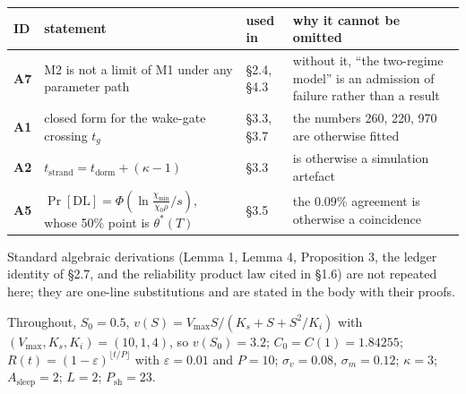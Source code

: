 \documentclass[11pt,a4paper]{article}
\newcounter{none}
\begin{document}
{\def\LTcaptype{none} %
\begin{longtable}[]{@{}
  >{\raggedright\arraybackslash}p{}
  >{\raggedright\arraybackslash}p{}
  >{\raggedright\arraybackslash}p{}
  >{\raggedright\arraybackslash}p{}@{}}
\toprule\noalign{}
\begin{minipage}[b]{\linewidth}\raggedright
ID
\end{minipage} & \begin{minipage}[b]{\linewidth}\raggedright
statement
\end{minipage} & \begin{minipage}[b]{\linewidth}\raggedright
used in
\end{minipage} & \begin{minipage}[b]{\linewidth}\raggedright
why it cannot be omitted
\end{minipage} \\
\midrule\noalign{}
\endhead
\bottomrule\noalign{}
\endlastfoot
\textbf{A7} & M2 is not a limit of M1 under any parameter path & §2.4, §4.3 & without it, ``the two-regime model'' is an admission of failure rather than a result \\
\textbf{A1} & closed form for the wake-gate crossing \(t_g\) & §3.3, §3.7 & the numbers 260, 220, 970 are otherwise fitted \\
\textbf{A2} & \(t_{\mathrm{strand}}=t_{\mathrm{dorm}}+(\kappa-1)\) & §3.3 & 279 is otherwise a simulation artefact \\
\textbf{A5} & \(\Pr[\mathrm{DL}]=\Phi\!\left(\ln\frac{\chi_{\min}}{\chi_0\rho}\big/s\right)\), whose 50\% point is \(\theta^\ast(T)\) & §3.5 & the 0.09\% agreement is otherwise a coincidence \\
\end{longtable}
}

Standard algebraic derivations (Lemma 1, Lemma 4, Proposition 3, the ledger
identity of §2.7, and the reliability product law cited in §1.6) are not repeated
here;
they are one-line substitutions and are stated in the body with their proofs.

Throughout, \(S_0=0.5\), \(v(S)=V_{\max}S/(K_s+S+S^2/K_i)\) with \((V_{\max},K_s,K_i)
=(10,1,4)\), so \(v(S_0)=3.2\); \(C_0=C(1)=1.84255\); \(R(t)=(1-\varepsilon)^{\lfloor
t/P\rfloor}\) with \(\varepsilon=0.01\) and \(P=10\); \(\sigma_v=0.08\),
\(\sigma_m=0.12\); \(\kappa=3\); \(A_{\mathrm{sleep}}=2\); \(L=2\); \(P_{\mathrm{sh}}=23\).
\end{document}
